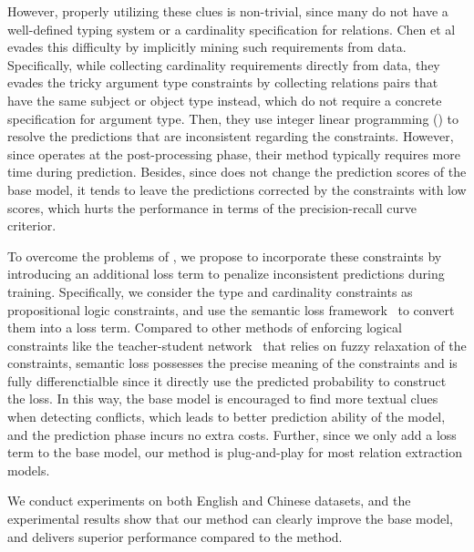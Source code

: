 However, properly utilizing these clues is non-trivial, since many \KBs do not have a well-defined typing system or a cardinality specification for relations.
Chen et al~ evades this difficulty by implicitly mining such requirements from data.
Specifically, while collecting cardinality requirements directly from data, they evades the tricky argument type constraints by collecting relations pairs that have the same subject or object type instead, which do not require a concrete specification for argument type.
Then, they use  integer linear programming (\ILP) to resolve the predictions that are inconsistent regarding the constraints.
However, since \ILP operates at the post-processing phase, their method typically requires more time during prediction.
Besides, since \ILP does not change the prediction scores of the base model, it tends to leave the predictions corrected by the constraints with low scores, which hurts the performance in terms of the precision-recall curve criterior.

To overcome the problems of \ILP, we propose to incorporate these constraints by introducing an additional loss term to penalize inconsistent predictions during training.
Specifically, we consider the type and cardinality constraints as propositional logic constraints, and use the semantic loss framework~\cite{xu2017semantic} to convert them into a loss term.
Compared to other methods of enforcing logical constraints like the teacher-student network~\cite{hu2016harnessing} that relies on fuzzy relaxation of the constraints, semantic loss possesses the precise meaning of the constraints and is fully differenctialble since it directly use the predicted probability to construct the loss.
In this way, the base model is encouraged to find more textual clues when detecting conflicts, which leads to better prediction ability of the model, and the prediction phase incurs no extra costs.
Further, since we only add a loss term to the base model, our method is plug-and-play for most relation extraction models.

We conduct experiments on both English and Chinese datasets,
and the experimental results show that our method can clearly improve the base model, and delivers superior performance compared to the \ILP method.

